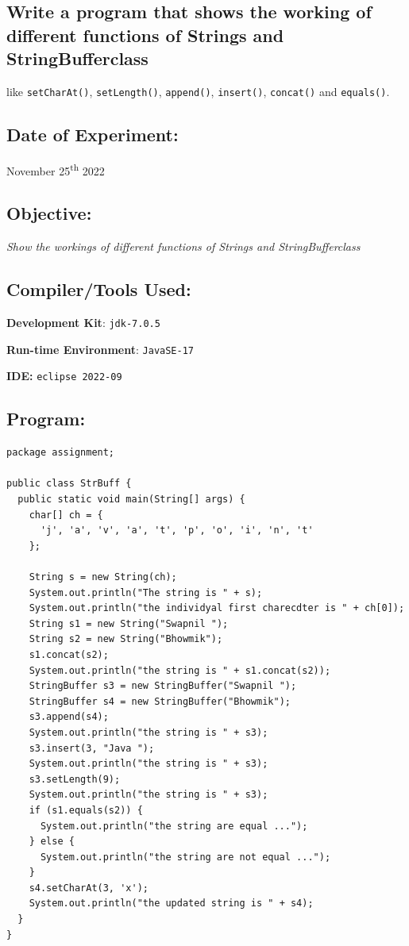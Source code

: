 \documentclass[12pt, a4paper]{article}
\begin{document}
\begin{tcolorbox}
\section{Write a program that shows the working of different functions of Strings and StringBufferclass}{like \texttt{setCharAt()}, \texttt{setLength()}, \texttt{append()}, \texttt{insert()}, \texttt{concat()} and \texttt{equals()}. }
\end{tcolorbox}
\subsection*{Date of Experiment:}
November 25\textsuperscript{th} 2022

\subsection*{Objective:}
\emph{\large{Show the workings of different functions of Strings and StringBufferclass}}

\subsection*{Compiler/Tools Used:}
\textbf{Development Kit}: \verb+jdk-7.0.5+

\textbf{Run-time Environment}: \verb+JavaSE-17+

\textbf{IDE:} \verb+eclipse 2022-09+

\subsection*{Program:}
\begin{lstlisting}
package assignment;

public class StrBuff {
  public static void main(String[] args) {
    char[] ch = { 
      'j', 'a', 'v', 'a', 't', 'p', 'o', 'i', 'n', 't' 
    };

    String s = new String(ch);
    System.out.println("The string is " + s);
    System.out.println("the individyal first charecdter is " + ch[0]);
    String s1 = new String("Swapnil ");
    String s2 = new String("Bhowmik");
    s1.concat(s2);
    System.out.println("the string is " + s1.concat(s2));
    StringBuffer s3 = new StringBuffer("Swapnil ");
    StringBuffer s4 = new StringBuffer("Bhowmik");
    s3.append(s4);
    System.out.println("the string is " + s3);
    s3.insert(3, "Java ");
    System.out.println("the string is " + s3);
    s3.setLength(9);
    System.out.println("the string is " + s3);
    if (s1.equals(s2)) {
      System.out.println("the string are equal ...");
    } else {
      System.out.println("the string are not equal ...");
    }
    s4.setCharAt(3, 'x');
    System.out.println("the updated string is " + s4);
  }
}
\end{lstlisting}
\end{document}
